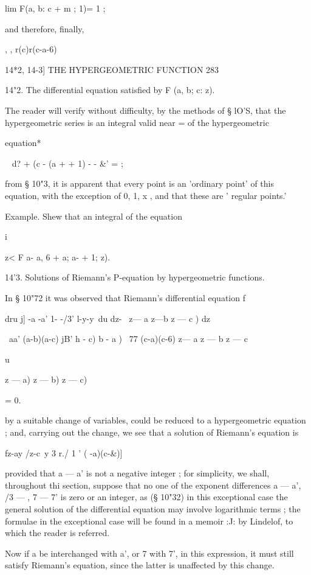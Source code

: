 lim F(a, b: c + m ; 1)= 1 ;

and therefore, finally,

   , , r(c)r(c-a-6)



14*2, 14-3] THE HYPERGEOMETRIC FUNCTION 283

14"2. The differential equation satisfied by F (a, b; c: z).

The reader will verify without difficulty, by the methods of § lO'S,
that the hypergeometric series is an integral valid near = of the
hypergeometric

equation*

   ~ d? + (c - (a + + 1) - - \&' = ;

from § 10"3, it is apparent that every point is an 'ordinary point' of
this equation, with the exception of 0, 1, x , and that these are '
regular points.'

Example. Shew that an integral of the equation

i

z< F a- a, 6 + a; a- + 1; z).

14'3. Solutions of Riemann's P-equation by hypergeometric functions.

In § 10"72 it was observed that Riemann's differential equation f

dru j] -a -a' 1- -/3' l-y-y\ du dz- \ z— a z—b z — c ) dz

\ aa' (a-b)(a-c) jB' h - c) b - a ) \ 77 (c-a)(c-6) z— a z — b z — c

u



 z — a) z — b) z — c)



= 0.



by a suitable change of variables, could be reduced to a
hypergeometric equation ; and, carrying out the change, we see that a
solution of Riemann's equation is

fz-ay /z-c\ y 3 r./ 1 ' ( -a)(c-\&)]

provided that a — a' is not a negative integer ; for simplicity, we
shall, throughout thi section, suppose that no one of the exponent
differences a — a', /3 — , 7 — 7' is zero or an integer, as (§ 10"32)
in this exceptional case the general solution of the differential
equation may involve logarithmic terms ; the formulae in the
exceptional case will be found in a memoir :J: by Lindelof, to which
the reader is referred.

Now if a be interchanged with a', or 7 with 7', in this expression, it
must still satisfy Riemann's equation, since the latter is unaffected
by this change.


